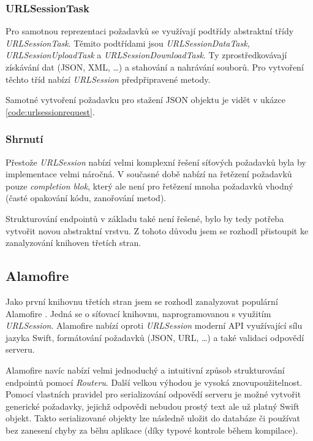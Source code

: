 
\subsubsection*{URLSessionTask}

Pro samotnou reprezentaci požadavků se využívají podtřídy abstraktní třídy \textit{URLSessionTask}.
Těmito podtřídami jsou \textit{URLSessionDataTask}, \textit{URLSessionUploadTask} a \textit{URLSessionDownloadTask}.
Ty zprostředkovávají získávání dat (JSON, XML, \ldots) a stahování a nahrávání souborů.
Pro vytvoření těchto tříd nabízí \textit{URLSession} předpřipravené metody.

Samotné vytvoření požadavku pro stažení JSON objektu je vidět v ukázce \ref{code:urlsessionrequest}.


\subsubsection*{Shrnutí}

Přestože \textit{URLSession} nabízí velmi komplexní řešení síťových požadavků byla by implementace velmi náročná.
V současné době nabízí na řetězení požadavků pouze \textit{completion blok}, který ale není pro řetězení mnoha požadavků vhodný (časté opakování kódu, zanořování metod).

Strukturování endpointů v základu také není řešené, bylo by tedy potřeba vytvořit novou abstraktní vrstvu.
Z tohoto důvodu jsem se rozhodl přistoupit ke zanalyzování knihoven třetích stran.

\subsection{Alamofire}

Jako první knihovnu třetích stran jsem se rozhodl zanalyzovat populární Alamofire \cite{github-alamofire}.
Jedná se o síťovací knihovnu, naprogramovanou s využitím \textit{URLSession}.
Alamofire nabízí oproti \textit{URLSession} moderní API využívající sílu jazyka Swift, formátování požadavků (JSON, URL, \ldots) a také validaci odpovědí serveru.

Alamofire navíc nabízí velmi jednoduchý a intuitivní způsob strukturování endpointů pomocí \textit{Routeru}.
Další velkou výhodou je vysoká znovupoužitelnost.
Pomocí vlastních pravidel pro serializování odpovědí serveru je možné vytvořit generické požadavky, jejichž odpovědi nebudou prostý text ale už platný Swift objekt.
Takto serializované objekty lze následně uložit do databáze či používat bez zanesení chyby za běhu aplikace (díky typové kontrole během kompilace).

